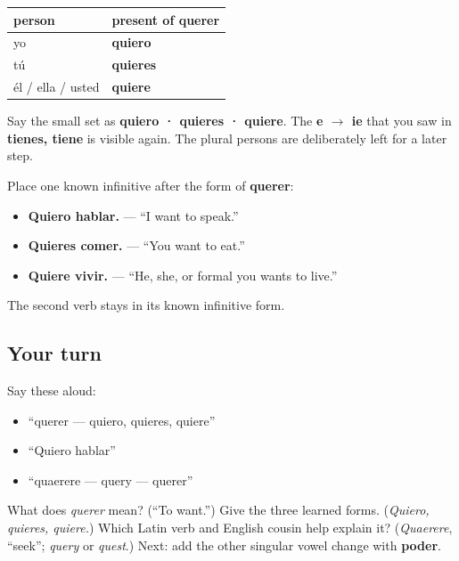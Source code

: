 \begin{grammarlens}[title={Grammar Lens: only the three singular forms}]
\noindent
\begin{tabularx}{\linewidth}{@{}>{\raggedright\arraybackslash}X>{\raggedright\arraybackslash}X@{}}
\toprule
\textbf{person} & \textbf{present of \textbf{querer}} \\
\midrule
yo & \textbf{quiero} \\
tú & \textbf{quieres} \\
él / ella / usted & \textbf{quiere} \\
\bottomrule
\end{tabularx}

Say the small set as \textbf{quiero · quieres · quiere}. The \textbf{e $\to$ ie} that you saw in \textbf{tienes, tiene} is visible again. The plural persons are deliberately left for a later step.

Place one known infinitive after the form of \textbf{querer}:

\begin{itemize}
\raggedright
  \item \textbf{Quiero hablar.} — “I want to speak.”
  \item \textbf{Quieres comer.} — “You want to eat.”
  \item \textbf{Quiere vivir.} — “He, she, or formal you wants to live.”
\end{itemize}

The second verb stays in its known infinitive form.
\end{grammarlens}

\subsection*{Your turn}
Say these aloud:

\begin{itemize}
\raggedright
  \item “querer — quiero, quieres, quiere”
  \item “Quiero hablar”
  \item “quaerere — query — querer”
\end{itemize}

\begin{tcolorbox}[breakable,colback=teal!4,colframe=teal!35!black,title={Before you move on}]
What does \emph{querer} mean? (“To want.”) Give the three learned forms. (\emph{Quiero, quieres, quiere.}) Which Latin verb and English cousin help explain it? (\emph{Quaerere}, “seek”; \emph{query} or \emph{quest}.) Next: add the other singular vowel change with \textbf{poder}.
\end{tcolorbox}
